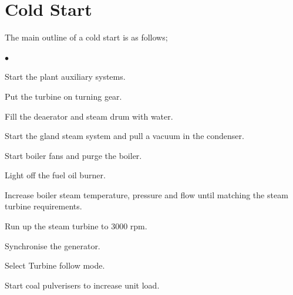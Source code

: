 \documentclass[10pt,a4paper]{article}
\begin{document}
\section*{Cold Start}\label{proc:coldstart}
The main outline of a cold start is as follows;
\begin{list}{$\bullet$}{}
\item Start the plant auxiliary systems.
\item Put the turbine on turning gear.
\item Fill the deaerator and steam drum with water.
\item Start the gland steam system and pull a vacuum in the condenser.
\item Start boiler fans and purge the boiler.
\item Light off the fuel oil burner.
\item Increase boiler steam temperature, pressure and flow until matching the steam turbine requirements.
\item Run up the steam turbine to 3000 rpm.
\item Synchronise the generator.
\item Select Turbine follow mode.
\item Start coal pulverisers to increase unit load.
\end{list}
\end{document}
